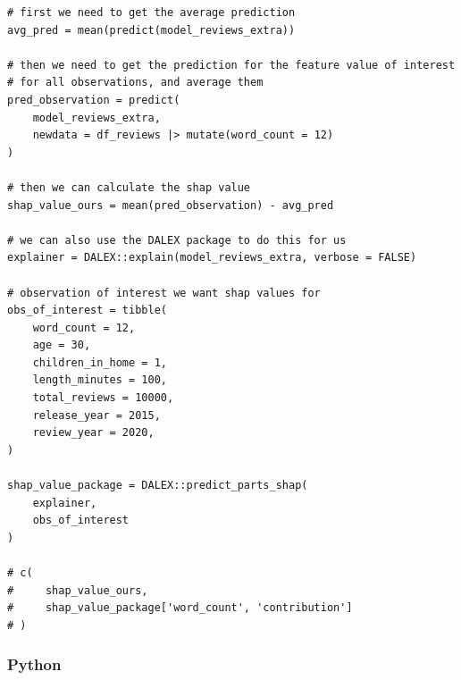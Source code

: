 \documentclass[
  letterpaper,
]{krantz}
\begin{document}
\begin{verbatim}
# first we need to get the average prediction
avg_pred = mean(predict(model_reviews_extra))

# then we need to get the prediction for the feature value of interest
# for all observations, and average them
pred_observation = predict(
    model_reviews_extra,
    newdata = df_reviews |> mutate(word_count = 12)
)

# then we can calculate the shap value
shap_value_ours = mean(pred_observation) - avg_pred

# we can also use the DALEX package to do this for us
explainer = DALEX::explain(model_reviews_extra, verbose = FALSE)

# observation of interest we want shap values for
obs_of_interest = tibble(
    word_count = 12,
    age = 30,
    children_in_home = 1,
    length_minutes = 100,
    total_reviews = 10000,
    release_year = 2015,
    review_year = 2020,
)

shap_value_package = DALEX::predict_parts_shap(
    explainer,
    obs_of_interest
)

# c(
#     shap_value_ours, 
#     shap_value_package['word_count', 'contribution']
# )
\end{verbatim}

\subsubsection{Python}
\end{document}
